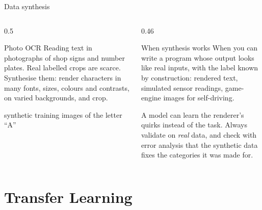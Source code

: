 \documentclass[aspectratio=169,10pt]{beamer}
\begin{document}
\begin{frame}{Data synthesis}
  \begin{columns}[T,onlytextwidth]
    \begin{column}{0.5\textwidth}
      \begin{block}{Photo OCR}
        \footnotesize
        Reading text in photographs of shop signs and number plates. Real labelled crops are
        scarce. Synthesise them: render characters in many fonts, sizes, colours and
        contrasts, on varied backgrounds, and crop.
      \end{block}
      \centering
      \par
      {\scriptsize synthetic training images of the letter ``A''}
    \end{column}
    \begin{column}{0.46\textwidth}
      \footnotesize
      \begin{block}{When synthesis works}
        When you can write a program whose output looks like real inputs, with the label
        known by construction: rendered text, simulated sensor readings, game-engine images
        for self-driving.
      \end{block}
      \begin{pitfall}
        \footnotesize A model can learn the renderer's quirks instead of the task. Always
        validate on \emph{real} data, and check with error analysis that the synthetic data
        fixes the categories it was made for.
      \end{pitfall}
    \end{column}
  \end{columns}
\end{frame}

\section{Transfer Learning}
\end{document}
